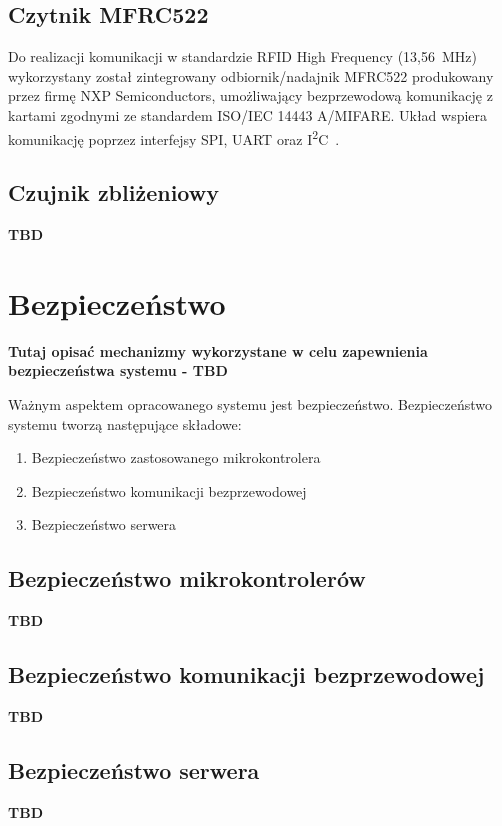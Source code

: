         \subsection{Czytnik MFRC522}

            Do realizacji komunikacji w standardzie RFID High Frequency (13,56~MHz) wykorzystany został zintegrowany odbiornik/nadajnik MFRC522 produkowany przez firmę NXP Semiconductors, umożliwający bezprzewodową komunikację z kartami zgodnymi ze standardem ISO/IEC 14443 A/MIFARE. Układ wspiera komunikację poprzez interfejsy SPI, UART oraz I\textsuperscript{2}C~\cite{mfrc522-ds}.

        \subsection{Czujnik zbliżeniowy}
            \textbf{TBD}

    \section{Bezpieczeństwo}

        \textbf{Tutaj opisać mechanizmy wykorzystane w celu zapewnienia bezpieczeństwa systemu - TBD}

        Ważnym aspektem opracowanego systemu jest bezpieczeństwo. Bezpieczeństwo systemu tworzą następujące składowe:
            \begin{enumerate}
                \item Bezpieczeństwo zastosowanego mikrokontrolera
                \item Bezpieczeństwo komunikacji bezprzewodowej
                \item Bezpieczeństwo serwera
            \end{enumerate}

            \subsection{Bezpieczeństwo mikrokontrolerów}
                \textbf{TBD}

            \subsection{Bezpieczeństwo komunikacji bezprzewodowej}
                \textbf{TBD}

            \subsection{Bezpieczeństwo serwera}
                \textbf{TBD}


